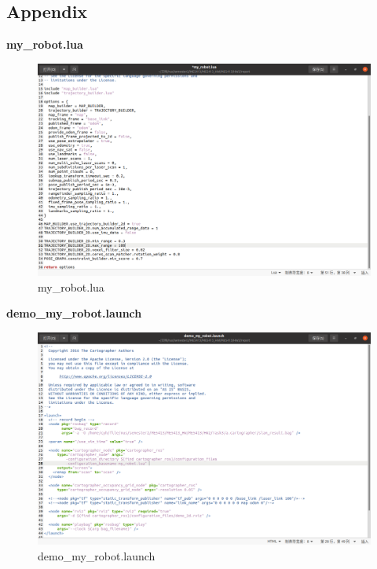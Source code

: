 \documentclass[hyperref]{article}
\theoremstyle{nonumberplain}
\begin{document}
\begin{appendices}
	
	\section{Appendix}
	
	\textbf{\textcolor[rgb]{0.98,0.00,0.00}{my\_robot.lua}}
	\begin{figure}[H]
		\centering
		\includegraphics[width=18cm]{appendix2.png}
		\caption{my\_robot.lua}
	\end{figure} 

	
	\textbf{\textcolor[rgb]{0.98,0.00,0.00}{demo\_my\_robot.launch}}
	
	\begin{figure}[H]
		\centering
			\includegraphics[width=18cm]{appendix1.png}
		\caption{demo\_my\_robot.launch}
	\end{figure} 
	

	
\end{appendices}



%	
%	





	
\end{document}
